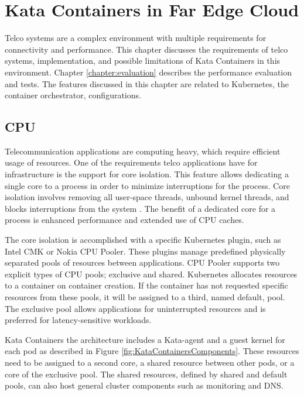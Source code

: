 \chapter{Kata Containers in Far Edge Cloud}
\label{chapter:implementation}

Telco systems are a complex environment with multiple requirements for connectivity and performance. This chapter discusses the requirements of telco systems, implementation, and possible limitations of Kata Containers in this environment. Chapter \ref{chapter:evaluation} describes the performance evaluation and tests. The features discussed in this chapter are related to Kubernetes, the container orchestrator, configurations.

\section{CPU}

Telecommunication applications are computing heavy, which require efficient usage of resources. One of the requirements telco applications have for infrastructure is the support for core isolation. This feature allows dedicating a single core to a process in order to minimize interruptions for the process. Core isolation involves removing all user-space threads, unbound kernel threads, and blocks interruptions from the system \cite{CPUisolation}. The benefit of a dedicated core for a process is enhanced performance and extended use of CPU caches.

The core isolation is accomplished with a specific Kubernetes plugin, such as Intel CMK\cite{IntelCMK} or Nokia CPU Pooler\cite{NokiaCPUPooler}. These plugins manage predefined physically separated pools of resources between applications. CPU Pooler supports two explicit types of CPU pools; exclusive and shared. Kubernetes allocates resources to a container on container creation. If the container has not requested specific resources from these pools, it will be assigned to a third, named default, pool. The exclusive pool allows applications for uninterrupted resources and is preferred for latency-sensitive workloads.

Kata Containers the architecture includes a Kata-agent and a guest kernel for each pod as described in Figure \ref{fig:KataContainersComponents}. These resources need to be assigned to a second core, a shared resource between other pods, or a core of the exclusive pool. The shared resources, defined by shared and default pools, can also host general cluster components such as monitoring and DNS.

